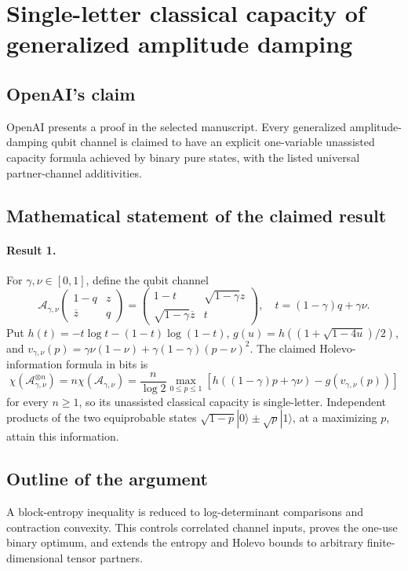 \documentclass[11pt]{article}
\begin{document}
\section*{Single-letter classical capacity of generalized amplitude damping}

\subsection{OpenAI's claim}
OpenAI presents a proof in the selected manuscript. Every generalized amplitude-damping qubit channel is claimed to have an explicit one-variable unassisted capacity formula achieved by binary pure states, with the listed universal partner-channel additivities.

\subsection{Mathematical statement of the claimed result}
\paragraph{Result 1.} For \(\gamma,\nu\in[0,1]\), define the qubit channel
\[
 \mathcal A_{\gamma,\nu}\begin{pmatrix}1-q&z\\\overline z&q\end{pmatrix}
 =\begin{pmatrix}1-t&\sqrt{1-\gamma}z\\\sqrt{1-\gamma}\overline z&t\end{pmatrix},
 \quad t=(1-\gamma)q+\gamma\nu.
\]
Put \(h(t)=-t\log t-(1-t)\log(1-t)\), \(g(u)=h((1+\sqrt{1-4u})/2)\), and \(v_{\gamma,\nu}(p)=\gamma\nu(1-\nu)+\gamma(1-\gamma)(p-\nu)^2\). The claimed Holevo-information formula in bits is
\[
 \chi(\mathcal A_{\gamma,\nu}^{\otimes n})
 =n\chi(\mathcal A_{\gamma,\nu})
 =\frac n{\log2}\max_{0\le p\le1}
 [h((1-\gamma)p+\gamma\nu)-g(v_{\gamma,\nu}(p))]
\]
for every \(n\ge1\), so its unassisted classical capacity is single-letter. Independent products of the two equiprobable states \(\sqrt{1-p}|0\rangle\pm\sqrt p|1\rangle\), at a maximizing \(p\), attain this information.

\subsection{Outline of the argument}
A block-entropy inequality is reduced to log-determinant comparisons and contraction convexity. This controls correlated channel inputs, proves the one-use binary optimum, and extends the entropy and Holevo bounds to arbitrary finite-dimensional tensor partners.
\end{document}
